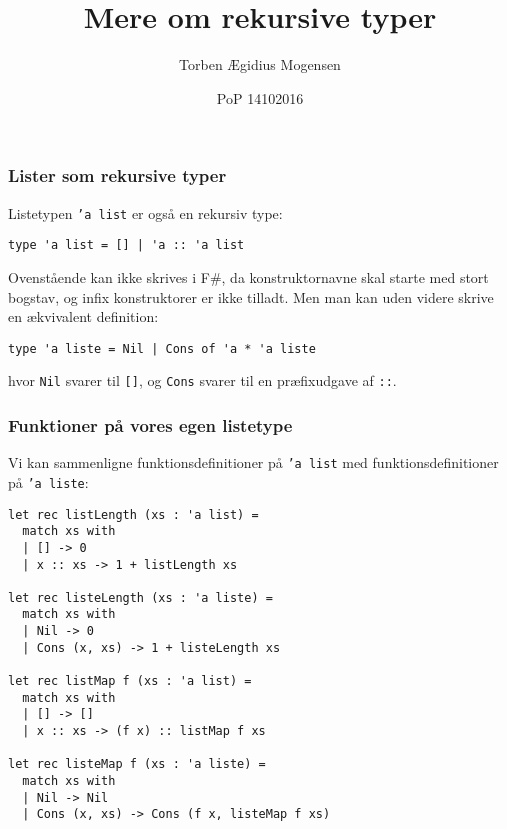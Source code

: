 \documentclass{beamer}
\title{Mere om rekursive typer}
\date[2016]{PoP 14102016}
\author{Torben Ægidius Mogensen}
\begin{document}
\begin{frame}
\titlepage
\end{frame}






\begin{frame}[fragile=singleslide]
\frametitle{Lister som rekursive typer}

Listetypen \texttt{'a list} er også en rekursiv type:

\begin{verbatim}
type 'a list = [] | 'a :: 'a list
\end{verbatim}

Ovenstående kan ikke skrives i F\#, da konstruktornavne skal starte med stort
bogstav, og infix konstruktorer er ikke tilladt.  Men man kan uden
videre skrive en ækvivalent definition:

\begin{verbatim}
type 'a liste = Nil | Cons of 'a * 'a liste
\end{verbatim}

hvor \texttt{Nil} svarer til \texttt{[]}, og \texttt{Cons} svarer til
en præfixudgave af \texttt{::}.


\end{frame}

\begin{frame}[fragile=singleslide]
\frametitle{Funktioner på vores egen listetype}

Vi kan sammenligne funktionsdefinitioner på \texttt{'a list} med
funktionsdefinitioner på \texttt{'a liste}:

\renewcommand{\baselinestretch}{0.85}
{\small
\begin{verbatim}
let rec listLength (xs : 'a list) =
  match xs with
  | [] -> 0
  | x :: xs -> 1 + listLength xs

let rec listeLength (xs : 'a liste) =
  match xs with
  | Nil -> 0
  | Cons (x, xs) -> 1 + listeLength xs

let rec listMap f (xs : 'a list) =
  match xs with
  | [] -> []
  | x :: xs -> (f x) :: listMap f xs

let rec listeMap f (xs : 'a liste) =
  match xs with
  | Nil -> Nil
  | Cons (x, xs) -> Cons (f x, listeMap f xs)
\end{verbatim}
}


\end{frame}
\end{document}
